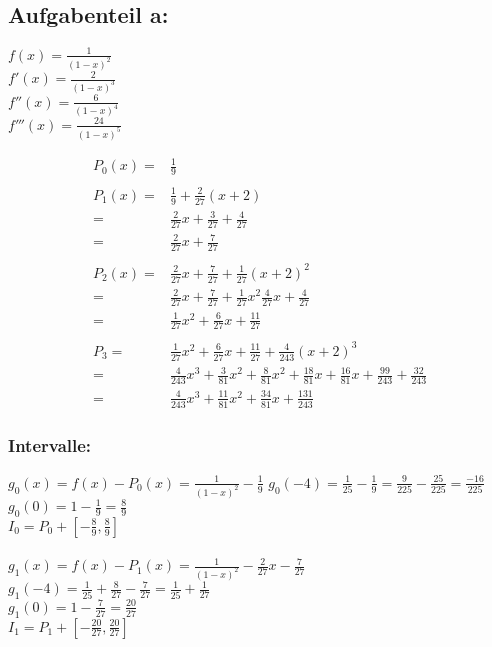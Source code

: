 
\subsection*{Aufgabenteil a:}

$f(x) = \frac{1}{(1-x)^2}$\\
$f'(x) = \frac{2}{(1-x)^3}$\\
$f''(x) = \frac{6}{(1-x)^4}$\\
$f'''(x) = \frac{24}{(1-x)^5}$

\begin{align*}
P_0(x) =& \frac{1}{9} \\\\
P_1(x) =& \frac{1}{9} + \frac{2}{27}(x+2) \\
=& \frac{2}{27} x + \frac{3}{27} + \frac{4}{27}\\
=& \frac{2}{27} x + \frac{7}{27} \\\\
P_2(x) =& \frac{2}{27} x + \frac{7}{27} + \frac{1}{27} (x+2)^2 \\
=& \frac{2}{27} x + \frac{7}{27} + \frac{1}{27} x^2 \frac{4}{27} x + \frac{4}{27}\\
=& \frac{1}{27} x^2 + \frac{6}{27} x + \frac{11}{27} \\\\
P_3 =& \frac{1}{27} x^2 + \frac{6}{27} x + \frac{11}{27} + \frac{4}{243}(x+2)^3 \\
=& \frac{4}{243} x^3 + \frac{3}{81} x^2 + \frac{8}{81} x^2 + \frac{18}{81} x + \frac{16}{81} x + \frac{99}{243} + \frac{32}{243}\\
=& \frac{4}{243} x^3 + \frac{11}{81} x^2 + \frac{34}{81} x + \frac{131}{243}
\end{align*}

\subsubsection*{Intervalle:}
$g_0(x) = f(x) - P_0(x) = \frac{1}{(1-x)^2} - \frac{1}{9}$
$g_0(-4)=\frac{1}{25} - \frac{1}{9} = \frac{9}{225} - \frac{25}{225} = \frac{-16}{225}$\\
$g_0(0)=1 - \frac{1}{9} = \frac{8}{9}$\\
$I_0= P_0 + [-\frac{8}{9}, \frac{8}{9}]$\\\\

$g_1(x)=f(x) - P_1(x)= \frac{1}{(1-x)^2} - \frac{2}{27} x - \frac{7}{27}$\\
$g_1(-4) = \frac{1}{25} + \frac{8}{27} - \frac{7}{27} = \frac{1}{25} + \frac{1}{27}$ \\
$g_1(0) = 1 - \frac{7}{27} = \frac{20}{27}$\\
$I_1=P_1+[-\frac{20}{27},\frac{20}{27}]$\\\\

